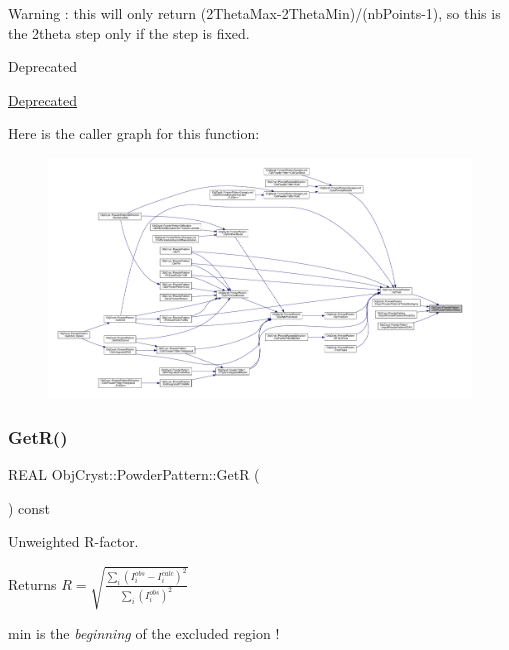 \begin{DoxyWarning}{Warning}
\+: this will only return (2Theta\+Max-\/2\+Theta\+Min)/(nb\+Points-\/1), so this is the 2theta step only if the step is fixed.
\end{DoxyWarning}
\begin{DoxyRefDesc}{Deprecated}
\item[\mbox{\hyperlink{deprecated__deprecated000025}{Deprecated}}]\end{DoxyRefDesc}
Here is the caller graph for this function\+:
\nopagebreak
\begin{figure}[H]
\begin{center}
\leavevmode
\includegraphics[width=350pt]{class_obj_cryst_1_1_powder_pattern_a6c86d0b0a22155319a212bfb4629c9dd_icgraph}
\end{center}
\end{figure}
\mbox{\label{class_obj_cryst_1_1_powder_pattern_a2ab62a5d2d1de517a01252875dc905ab}} 
\subsubsection{\texorpdfstring{GetR()}{GetR()}}
{\footnotesize\ttfamily R\+E\+AL Obj\+Cryst\+::\+Powder\+Pattern\+::\+GetR (\begin{DoxyParamCaption}{ }\end{DoxyParamCaption}) const}



Unweighted R-\/factor. 

\begin{DoxyReturn}{Returns}
$ R= \sqrt {\frac{\sum_i \left( I_i^{obs}-I_i^{calc} \right)^2} {\sum_i (I_i^{obs})^2} }$ 
\end{DoxyReturn}
min is the {\itshape beginning} of the excluded region !

